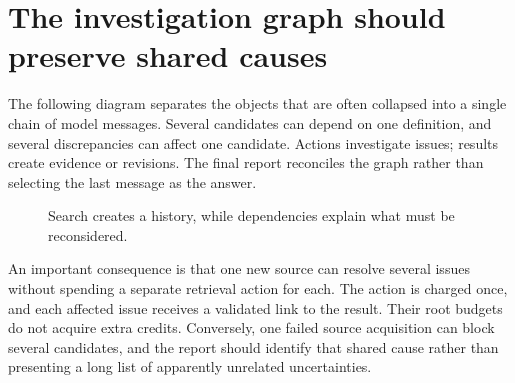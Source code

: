 \section{The investigation graph should preserve shared causes}

The following diagram separates the objects that are often collapsed into a
single chain of model messages. Several candidates can depend on one definition,
and several discrepancies can affect one candidate. Actions investigate issues;
results create evidence or revisions. The final report reconciles the graph rather
than selecting the last message as the answer.

\begin{figure}[htbp]
\centering
{}
\caption{Search creates a history, while dependencies explain what must be reconsidered.}
\label{fig:ensemble-dependencies}
\end{figure}

An important consequence is that one new source can resolve several issues
without spending a separate retrieval action for each. The action is charged once,
and each affected issue receives a validated link to the result. Their root
budgets do not acquire extra credits. Conversely, one failed source acquisition
can block several candidates, and the report should identify that shared cause
rather than presenting a long list of apparently unrelated uncertainties.


